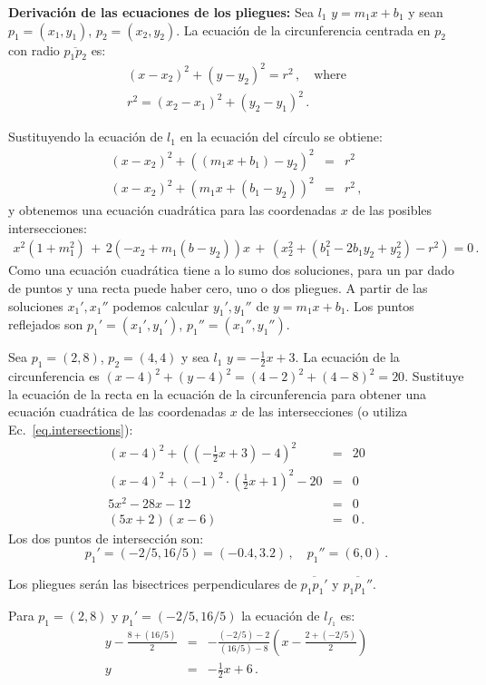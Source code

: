 \noindent\textbf{Derivación de las ecuaciones de los pliegues:}
Sea $l_1$ $y=m_1x + b_1$ y sean $p_1=(x_1,y_1)$, $p_2=(x_2,y_2)$. La ecuación de la circunferencia centrada en $p_2$ con radio $\overline{p_1p_2}$ es:
\begin{eqnarray*}
(x-x_2)^2 + (y-y_2)^2 = r^2\,,\quad \textrm{where}\\
r^2= (x_2-x_1)^2 + (y_2-y_1)^2\,.
\end{eqnarray*}

Sustituyendo la ecuación de $l_1$ en la ecuación del círculo se obtiene:
\begin{eqnarray*}
(x-x_2)^2+((m_1x+b_1)-y_2)^2&=&r^2\\
(x-x_2)^2+(m_1x+(b_1-y_2))^2&=&r^2\,,
\end{eqnarray*}
y obtenemos una ecuación cuadrática para las coordenadas $x$ de las posibles intersecciones:
\begin{align}
x^2(1+m_1^2) \,+\, 2(-x_2+m_1(b-y_2))x \,+\,(x_2^2 + (b_1^2 - 2b_1y_2+y_2^2)-r^2)=0\,.\label{eq.intersections}
\end{align}
Como una ecuación cuadrática tiene a lo sumo dos soluciones, para un par dado de puntos y una recta puede haber cero, uno o dos pliegues. A partir de las soluciones $x_1',x_1''$ podemos calcular $y_1',y_1''$ de $y=m_1x+b_1$. Los puntos reflejados son $p_1'=(x_1',y_1')$, $p_1''=(x_1'',y_1'')$.
\begin{example}
Sea $p_1=(2,8)$, $p_2=(4,4)$ y sea $l_1$ $y=-\frac{1}{2}x +3$. La ecuación de la circunferencia es $(x-4)^2 + (y-4)^2 = (4-2)^2+(4-8)^2=20$. Sustituye la ecuación de la recta en la ecuación de la circunferencia para obtener una ecuación cuadrática de las coordenadas $x$ de las intersecciones (o utiliza Ec.~\ref{eq.intersections}):
\begin{eqnarray*}
(x-4)^2 + \left(\left(-\frac{1}{2}x+3\right)-4\right)^2&=&20\\
(x-4)^2 + (-1)^2\cdot\left(\frac{1}{2}x+1\right)^2-20&=&0\\
5x^2 -28x -12&=&0\\
(5x+2)(x-6)&=&0\,.
\end{eqnarray*}
Los dos puntos de intersección son:
\[
p_1'=(-2/5,16/5) = (-0.4,3.2)\,,\quad p_1''=(6,0)\,.
\]
\end{example}
Los pliegues serán las bisectrices perpendiculares de $\overline{p_1p_1'}$ y $\overline{p_1p_1''}$.
\begin{example}
Para $p_1=(2,8)$ y $p_1'=(-2/5,16/5)$ la ecuación de $l_{f_1}$ es:
\begin{eqnarray*}
y-\frac{8+(16/5)}{2}&=&-\frac{(-2/5)-2}{(16/5)-8}\left(x-\frac{2+\left(-2/5\right)}{2}\right)\\
y&=&-\frac{1}{2}x+6\,.
\end{eqnarray*}
\end{example}

